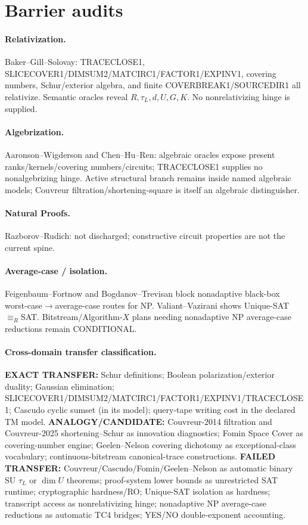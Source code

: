 \documentclass[11pt]{article}
\begin{document}
\section*{Barrier audits}
\paragraph{Relativization.}
Baker--Gill--Solovay: TRACECLOSE1, SLICECOVER1/DIMSUM2/MATCIRC1/FACTOR1/EXPINV1, covering
numbers, Schur/exterior algebra, and finite COVERBREAK1/SOURCEDIR1 all relativize. Semantic
oracles reveal $R,\tau_L,d,U,G,K$. No nonrelativizing hinge is supplied.
\paragraph{Algebrization.}
Aaronson--Wigderson and Chen--Hu--Ren: algebraic oracles expose present ranks/kernels/covering
numbers/circuits; TRACECLOSE1 supplies no nonalgebrizing hinge. Active structural branch remains
inside named algebraic models; Couvreur filtration/shortening-square is itself an algebraic
distinguisher.
\paragraph{Natural Proofs.}
Razborov--Rudich: not discharged; constructive circuit properties are not the current spine.
\paragraph{Average-case / isolation.}
Feigenbaum--Fortnow and Bogdanov--Trevisan block nonadaptive black-box worst-case$\to$average-case
routes for NP. Valiant--Vazirani shows Unique-SAT$\equiv_R$SAT. Bitstream/Algorithm-$X$ plans
needing nonadaptive NP average-case reductions remain CONDITIONAL.
\paragraph{Cross-domain transfer classification.}
\textbf{EXACT TRANSFER:} Schur definitions; Boolean polarization/exterior duality; Gaussian
elimination; SLICECOVER1/DIMSUM2/MATCIRC1/FACTOR1/EXPINV1/TRACECLOSE1; Cascudo cyclic sumset
(in its model); query-tape writing cost in the declared TM model.
\textbf{ANALOGY/CANDIDATE:} Couvreur-2014 filtration and Couvreur-2025 shortening--Schur as
innovation diagnostics; Fomin Space Cover as covering-number engine; Geelen--Nelson covering
dichotomy as exceptional-class vocabulary; continuous-bitstream canonical-trace constructions.
\textbf{FAILED TRANSFER:} Couvreur/Cascudo/Fomin/Geelen--Nelson as automatic binary SU $\tau_L$
or $\dim U$ theorems; proof-system lower bounds as unrestricted SAT runtime; cryptographic
hardness/RO; Unique-SAT isolation as hardness; transcript access as nonrelativizing hinge;
nonadaptive NP average-case reductions as automatic TC4 bridges; YES/NO double-exponent
accounting.
\end{document}
